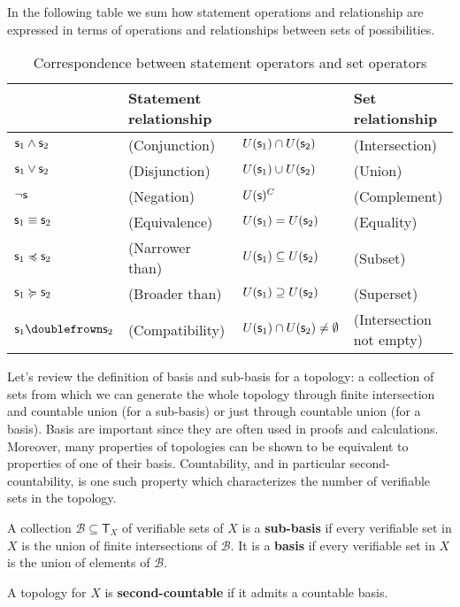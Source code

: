\documentclass[11pt,letterpaper,fleqn]{memoir} %
\begin{document}
In the following table we sum how statement operations and relationship are expressed in terms of operations and relationships between sets of possibilities.

\begin{table}[h]
	\centering
	\begin{tabular}{p{} p{} p{} p{}}
		& Statement relationship & & Set relationship  \\ 
		\hline 
		$\mathsf{s}_1 \wedge \mathsf{s}_2$ & (Conjunction) & $U(\mathsf{s}_1) \cap U(\mathsf{s}_2)$ & (Intersection) \\ 
		$\mathsf{s}_1 \vee \mathsf{s}_2$ & (Disjunction) & $U(\mathsf{s}_1) \cup U(\mathsf{s}_2)$ & (Union) \\ 
		$\neg \mathsf{s}$ & (Negation) & $U(\mathsf{s})^C$ & (Complement) \\ 
		$\mathsf{s}_1 \equiv \mathsf{s}_2$ & (Equivalence) & $U(\mathsf{s}_1) = U(\mathsf{s}_2)$ & (Equality) \\ 
		$\mathsf{s}_1 \preccurlyeq \mathsf{s}_2$ & (Narrower than) & $U(\mathsf{s}_1) \subseteq U(\mathsf{s}_2)$ & (Subset) \\ 
		$\mathsf{s}_1 \succcurlyeq \mathsf{s}_2$ & (Broader than) & $U(\mathsf{s}_1) \supseteq U(\mathsf{s}_2)$ & (Superset) \\ 
		$\stmt_1 \comp \stmt_2$ & (Compatibility) & $U(\mathsf{s}_1) \cap U(\mathsf{s}_2) \neq \emptyset$ & (Intersection not empty)
	\end{tabular} 
	\caption{Correspondence between statement operators and set operators}
\end{table}

Let's review the definition of basis and sub-basis for a topology: a collection of sets from which we can generate the whole topology through finite intersection and countable union (for a sub-basis) or just through countable union (for a basis). Basis are important since they are often used in proofs and calculations. Moreover, many properties of topologies can be shown to be equivalent to properties of one of their basis. Countability, and in particular second-countability, is one such property which characterizes the number of verifiable sets in the topology.

\begin{mathSection}
\begin{defn}
	A collection $\mathcal{B} \subseteq \mathsf{T}_X$ of verifiable sets of $X$ is a \textbf{sub-basis} if every verifiable set in $X$ is the union of finite intersections of $\mathcal{B}$. It is a \textbf{basis} if every verifiable set in $X$ is the union of elements of $\mathcal{B}$.
\end{defn}
\begin{defn}
	A topology for $X$ is \textbf{second-countable} if it admits a countable basis.
\end{defn}
\end{mathSection}
\end{document}
